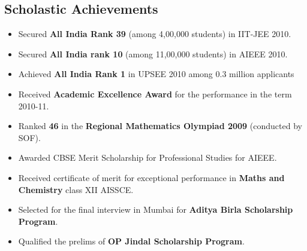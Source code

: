 \documentclass[margin,line]{resume}
\begin{document}
\begin{resume}
    \section{\mysidestyle Scholastic Achievements} 
    \begin{itemize}
    \item Secured \textbf{\textsf{All India Rank 39}} (among 4,00,000 students) in IIT-JEE 2010.
    \item Secured \textbf{\textsf{All India rank 10}} (among 11,00,000 students) in AIEEE 2010.
    \item Achieved \textbf{\textsf{All India Rank 1}} in UPSEE 2010 among 0.3 million applicants
    \item Received \textbf{\textsf{Academic Excellence Award}} for the performance in the term 2010-11.
    \item Ranked \textbf{\textsf{46}} in the \textbf{\textsf{Regional Mathematics Olympiad 2009}} (conducted by SOF).
    \item Awarded CBSE Merit Scholarship for Professional Studies for AIEEE.
    \item Received certificate of merit for exceptional performance in \textbf{\textsf{Maths and Chemistry}} class XII AISSCE.
    \item Selected for the final interview in Mumbai for \textbf{\textsf{Aditya Birla Scholarship Program}}.
    \item Qualified the prelims of \textbf{\textsf{OP Jindal Scholarship Program}}.
    \end{itemize}


\end{resume}
\end{document}
